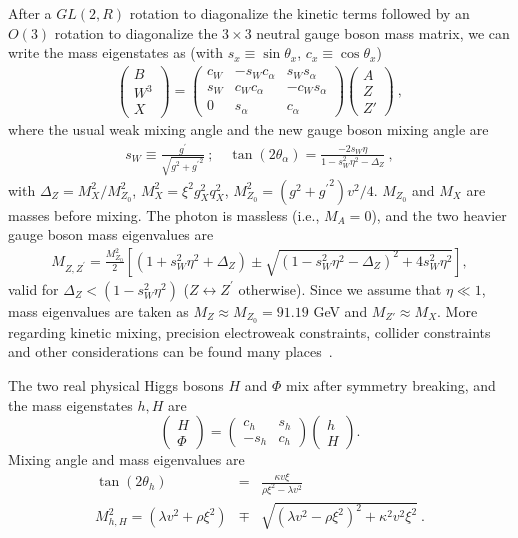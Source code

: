 \documentclass[12pt]{article}
\def\beq{\begin{eqnarray}}
\def\eeq{\end{eqnarray}}
\def\bea{\begin{eqnarray}}
\def\eea{\end{eqnarray}}
\begin{document}
After a $GL(2,R)$ rotation to diagonalize the kinetic terms followed by an $O(3)$ rotation
to diagonalize the $3 \times 3$ neutral gauge boson mass matrix, we can write the
mass eigenstates as (with $s_x\equiv \sin{\theta_x}$,  $c_x\equiv \cos{\theta_x}$)
\bea
\begin{pmatrix} B \\ W^3 \\ X  \end{pmatrix} =
\begin{pmatrix}
c_W & -s_W c_\alpha  & s_W s_\alpha \\
s_W & c_W c_\alpha & -c_W s_\alpha \\
0 & s_\alpha & c_\alpha
\end{pmatrix}
\begin{pmatrix} A \\ Z \\ Z'  \end{pmatrix} \ ,
\label{GAU2MAS.EQ}
\eea
where the
usual weak mixing angle and the new gauge boson mixing angle  are
\beq
s_W \equiv \frac{g^\prime}{\sqrt{g^2 + {g^\prime}^2}} \ ; \quad
\tan{\left( 2\theta_\alpha \right)} = \frac{-2 s_W \eta}{1 - s_W^2\eta^2 - \Delta_Z} \ ,
\label{tan2al.EQ}
\eeq
with $\Delta_Z =
M_{X}^2/M_{Z_0}^2$, $M_{X}^2 = \xi^2 g_X^2 q_X^2$, $M_{Z_0}^2 =
(g^2 + {g^\prime}^2) v^2 / 4$. $M_{Z_0}$ and $M_X$ are masses before mixing. The photon is massless (i.e., $M_A = 0 $), and the two heavier gauge boson
mass eigenvalues are 
\begin{eqnarray} 
M_{Z, Z^\prime} = \frac{M_{Z_0}^2}{2}
\left[\left(1+s_W^2 \eta^2 + \Delta_Z \right) 
\pm \sqrt{\left( 1 - s_W^2 \eta^2 - \Delta_Z \right)^2
+ 4 s_W^2 \eta^2 } \right] ,
\end{eqnarray}
valid for $\Delta_Z < (1-s_W^2 \eta^2)$ ($Z \leftrightarrow Z^\prime$ otherwise). Since we assume that $\eta \ll 1$, mass
eigenvalues are taken as $M_Z \approx M_{Z_0}=91.19$ GeV and 
$M_{Z'} \approx M_X$. More regarding kinetic mixing, precision electroweak constraints, collider constraints and other considerations can be found many places~\cite{kinetic mixing}.

The two real physical Higgs bosons $H$ and $\Phi$ mix after symmetry breaking,
and the mass eigenstates $h, H$ are
\begin{displaymath} \left( \begin{array}{c} H \\ \Phi
\end{array} \right) = \left( \begin{array}{cc} c_h & s_h \\ -s_h &
c_h \end{array} \right) \left( \begin{array}{c} h \\ H \end{array}
\right).
\end{displaymath}
Mixing angle and mass eigenvalues are 
\begin{eqnarray}
\tan{(2\theta_h)} &=& \frac{\kappa v \xi}{\rho \xi^2 - \lambda v^2}
\
\\ M_{h,H}^2 = \left( \lambda v^2 + \rho \xi^2 \right)
            &\mp& \sqrt{ (\lambda v^2 - \rho \xi^2)^2 + \kappa^2 v^2 \xi^2} \ .
\end{eqnarray}
\end{document}
